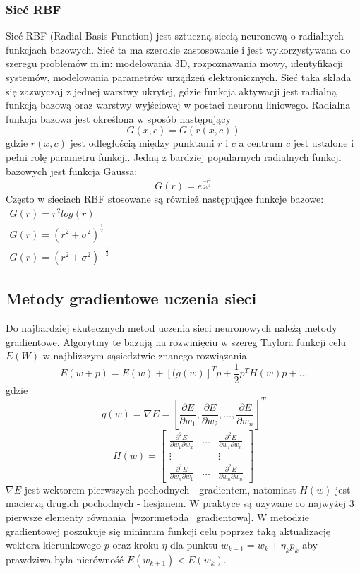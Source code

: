 \pagebreak
\subsubsection*{Sieć RBF}
Sieć RBF (Radial Basis Function) jest sztuczną siecią neuronową o radialnych funkcjach bazowych. Sieć ta ma szerokie zastosowanie i jest wykorzystywana do szeregu problemów m.in: modelowania 3D, rozpoznawania mowy, identyfikacji systemów, modelowania parametrów urządzeń elektronicznych\cite{Bors}. Sieć taka składa się zazwyczaj z jednej warstwy ukrytej, gdzie funkcja aktywacji jest radialną funkcją bazową oraz warstwy wyjściowej w postaci neuronu liniowego. Radialna funkcja bazowa jest określona w sposób następujący\cite[str. 1]{Bartkowiak}
\begin{equation}
	G(x,c) = G(r(x,c))
\end{equation}
gdzie $r(x,c)$ jest odległością między punktami $r$ i $c$ a centrum $c$ jest ustalone i pełni rolę parametru funkcji. Jedną z bardziej popularnych radialnych funkcji bazowych jest funkcja Gaussa:
\begin{equation}
	G(r) = e^{\frac{-r^2}{2\sigma^2}}
\end{equation}
Często w sieciach RBF stosowane są również następujące funkcje bazowe\cite{Chen}: \\
$\begin{array}{l}
 G(r) = r^2 log(r)\\
 G(r) = (r^2 + \sigma^2)^{\frac{1}{2}} \\
 G(r) = (r^2 + \sigma^2)^{-\frac{1}{2}}
\end{array}
$
\subsection{Metody gradientowe uczenia sieci}
Do najbardziej skutecznych metod uczenia sieci neuronowych należą metody gradientowe. Algorytmy te bazują na rozwinięciu w szereg Taylora funkcji celu $E(W)$ w najbliższym sąsiedztwie znanego rozwiązania\cite[str. 54]{Osowski}.
\begin{equation}
	\label{wzor:metoda_gradientowa}
	E(w + p) = E(w) + [(g(w)]^Tp + \frac{1}{2}p^TH(w)p + \hdots
\end{equation}
gdzie
$$g(w) = \nabla E = [\frac{\partial E}{\partial w_1}, \frac{\partial E}{\partial w_2}, \hdots, \frac{\partial E}{\partial w_n}]^T$$
$$H(w) = \begin{bmatrix}
\frac{\partial^2 E}{\partial w_1 \partial w_2} & \hdots & \frac{\partial^2 E}{\partial w_1 \partial w_n}\\
\vdots & & \vdots \\
\frac{\partial^2 E}{\partial w_n \partial w_1} & \hdots & \frac{\partial^2 E}{\partial w_n \partial w_n}
\end{bmatrix}$$
$\nabla E$ jest wektorem pierwszych pochodnych - gradientem, natomiast $H(w)$ jest macierzą drugich pochodnych - hesjanem. W praktyce są używane co najwyżej 3 pierwsze elementy równania~\ref{wzor:metoda_gradientowa}. W metodzie gradientowej poszukuje się minimum funkcji celu poprzez taką aktualizację wektora kierunkowego $p$ oraz kroku $\eta$ dla punktu $w_{k+1} = w_k + \eta_k p_k$ aby prawdziwa była nierówność $E(w_{k+1}) < E(w_k)$.

